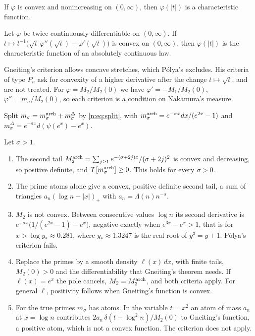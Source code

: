 \begin{theorem}
If $\varphi$ is convex and nonincreasing on $(0,\infty)$, then $\varphi(|t|)$ is a characteristic function.
\end{theorem}

\begin{theorem}
Let $\varphi$ be twice continuously differentiable on $(0,\infty)$. If $t\mapsto t^{-1}\big(\sqrt t\,\varphi''(\sqrt t)-\varphi'(\sqrt t)\big)$ is convex on $(0,\infty)$, then $\varphi(|t|)$ is the characteristic function of an absolutely continuous law.
\end{theorem}

Gneiting's criterion allows concave stretches, which Pólya's excludes. His criteria of type $P_n$ \cite{Gneiting01} ask for convexity of a higher derivative after the change $t\mapsto\sqrt t$, and are not treated. For $\varphi=M_2/M_2(0)$ we have $\varphi'=-M_1/M_2(0)$, $\varphi''=m_\sigma/M_2(0)$, so each criterion is a condition on Nakamura's measure.

Split $m_\sigma=m^{\rm arch}_\sigma+m^\Delta_\sigma$ by \eqref{n:eq:split}, with $m^{\rm arch}_\sigma=e^{-\sigma x}dx/(e^{2x}-1)$ and $m^\Delta_\sigma=e^{-\sigma x}d(\psi(e^x)-e^x)$.

\begin{proposition}[proved]\label{n:prop:gneiting}
Let $\sigma>1$.
\begin{enumerate}
\item The second tail $M_2^{\rm arch}=\sum_{j\ge1}e^{-(\sigma+2j)x}/(\sigma+2j)^2$ is convex and decreasing, so positive definite, and $\mathcal T[m_\sigma^{\rm arch}]\ge0$. This holds for every $\sigma>0$.
\item The prime atoms alone give a convex, positive definite second tail, a sum of triangles $a_n(\log n-|x|)_+$ with $a_n=\Lambda(n)n^{-\sigma}$.
\item $M_2$ is not convex. Between consecutive values $\log n$ its second derivative is $e^{-\sigma x}\big(1/(e^{2x}-1)-e^x\big)$, negative exactly when $e^{3x}-e^x>1$, that is for $x>\log y_*\approx0.281$, where $y_*\approx1.3247$ is the real root of $y^3=y+1$. Pólya's criterion fails.
\item Replace the primes by a smooth density $\ell(x)\,dx$, with finite tails, $M_2(0)>0$ and the differentiability that Gneiting's theorem needs. If $\ell(x)=e^x$ the pole cancels, $M_2=M_2^{\rm arch}$, and both criteria apply. For general $\ell$, positivity follows when Gneiting's function is convex.
\item For the true primes $m_\sigma$ has atoms. In the variable $t=x^2$ an atom of mass $a_n$ at $x=\log n$ contributes $2a_n\,\delta(t-\log^2n)/M_2(0)$ to Gneiting's function, a positive atom, which is not a convex function. The criterion does not apply.
\end{enumerate}
\end{proposition}

